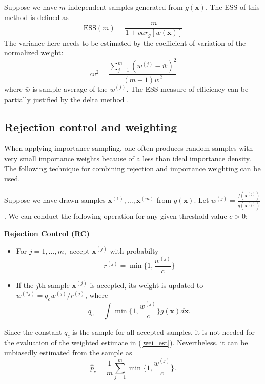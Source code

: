 \documentclass[times, utf8, diplomski]{fer}
\begin{document}
Suppose we have $m$ independent samples generated from $g(\mathbf{x})$. The ESS of this method is defined as 
\begin{equation*}
\text{ESS}(m) = \frac{m}{1 + var_g[w(\mathbf{x})]}
\end{equation*}  
The variance here needs to be estimated by the coefficient of variation of the normalized weight:
\begin{equation*}
cv^2 = \frac{\sum_{j=1}^{m} (w^{(j)} - \bar{w})^2}{(m - 1)\bar{w}^2}
\end{equation*}
where $\bar{w}$ is sample average of the $w^{(j)}$. The ESS measure of efficiency can be partially justified by the delta method \cite{Liu}.


\subsection{Rejection control and weighting}
When applying importance sampling, one often produces random samples with very small importance weights because of a less than ideal importance density. The following technique for combining rejection and importance weighting can be used. 

Suppose we have drawn samples $\mathbf{x}^{(1)}, \ldots, \mathbf{x}^{(m)}$ from $g(\mathbf{x})$. Let $w^{(j)} =  \frac{f(\mathbf{x}^{(j)})}{g(\mathbf{x}^{(j)})}$. We can conduct the following operation for any given threshold value $c > 0$:

\label{RC}
\textbf{Rejection Control (RC)}
\begin{itemize}
\item{For $j = 1, \ldots, m,$ accept $\mathbf{x}^{(j)}$ with probabilty 
\begin{equation*}
r^{(j)} =  \min  \Big \{ {1, \frac{w^{(j)}}{c}} \Big \}
\end{equation*}}
\item{If the $j$th sample $\mathbf{x}^{(j)}$ is accepted, its weight is updated to $w^{(*j)} = q_c w^{(j)} / r^{(j)}$, where 
\begin{equation*}
q_c = \int \min  \Big \{ {1, \frac{w^{(j)}}{c}} \Big \} g(\mathbf{x}) d\mathbf{x}.
\end{equation*}
}
\end{itemize}

Since the constant $q_c$ is the sample for all accepted samples, it is not needed for the  evaluation of the weighted estimate in (\ref{wei_est}). Nevertheless, it can be unbiasedly estimated \cite{Liu} from the sample as 
\begin{equation*}
\hat{p}_{c} = \frac{1}{m} \sum_{j = 1}^{m} \min  \Big \{ {1, \frac{w^{(j)}}{c}} \Big \}.
\end{equation*}
\end{document}
